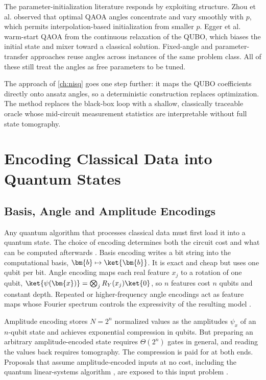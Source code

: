 The parameter-initialization literature responds by exploiting structure. Zhou et al. \cite{zhou2020qaoa} observed that optimal QAOA angles concentrate and vary smoothly with $p$, which permits interpolation-based initialization from smaller $p$. Egger et al. \cite{egger2021warmstart} warm-start QAOA from the continuous relaxation of the QUBO, which biases the initial state and mixer toward a classical solution. Fixed-angle and parameter-transfer approaches reuse angles across instances of the same problem class. All of these still treat the angles as free parameters to be tuned.

The \deal{} approach of \cref{ch:nisq} \cite{guo2025deal} goes one step further: it maps the QUBO coefficients directly onto ansatz angles, so a deterministic construction replaces optimization. The \qawa{} method \cite{guo2025qawa} replaces the black-box loop with a shallow, classically traceable oracle whose mid-circuit measurement statistics are interpretable without full state tomography.

\section{Encoding Classical Data into Quantum States}\label{sec:bg:encoding}

\subsection{Basis, Angle and Amplitude Encodings}

Any quantum algorithm that processes classical data must first load it into a quantum state. The choice of encoding determines both the circuit cost and what can be computed afterwards \cite{schuld2021dataencoding,larose2020encodings}. Basis encoding writes a bit string into the computational basis, $\bm{b}\mapsto\ket{\bm{b}}$. It is exact and cheap but uses one qubit per bit. Angle encoding maps each real feature $x_j$ to a rotation of one qubit, $\ket{\psi(\bm{x})}=\bigotimes_j R_Y(x_j)\ket{0}$, so $n$ features cost $n$ qubits and constant depth. Repeated or higher-frequency angle encodings act as feature maps whose Fourier spectrum controls the expressivity of the resulting model \cite{schuld2021dataencoding,havlicek2019featurespaces}.

Amplitude encoding stores $N=2^n$ normalized values as the amplitudes $\psi_x$ of an $n$-qubit state and achieves exponential compression in qubits. But preparing an arbitrary amplitude-encoded state requires $\Theta(2^n)$ gates in general, and reading the values back requires tomography. The compression is paid for at both ends. Proposals that assume amplitude-encoded inputs at no cost, including the quantum linear-systems algorithm \cite{harrow2009hhl}, are exposed to this input problem \cite{biamonte2017qml}.


